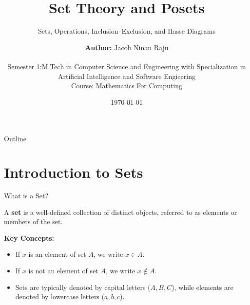 \documentclass{beamer}
\title[Discrete Mathematics]{Set Theory and Posets}
\subtitle{Sets, Operations, Inclusion--Exclusion, and Hasse Diagrams}
\author[Your Name]{%
  \textbf{Author:} Jacob Ninan Raju \\[0.3em]
  \\Semester 1:M.Tech in Computer Science and Engineering with Specialization
  in Artificial Intelligence and Software Engieering
  \small 
  \\ Course: Mathematics For Computing
}
\institute[Your University]{
  Department of Computer Science \& Engineering \\
  CUSAT
}
\date{\today}
\begin{document}
\begin{frame}[plain] %
    \titlepage
\end{frame}

\begin{frame}{Outline}
    \tableofcontents
\end{frame}

\section{Introduction to Sets}
\begin{frame}{What is a Set?}
    \begin{definition}
        A \textbf{set} is a well-defined collection of distinct objects, referred to as elements or members of the set.
    \end{definition}

    \vspace{0.5cm}
    \textbf{Key Concepts:}
    \begin{itemize}
        \item If $x$ is an element of set $A$, we write $x \in A$.
        \item If $x$ is not an element of set $A$, we write $x \notin A$.
        \item Sets are typically denoted by capital letters ($A, B, C$), while elements are denoted by lowercase letters ($a, b, c$).
    \end{itemize}
\end{frame}

\end{document}
